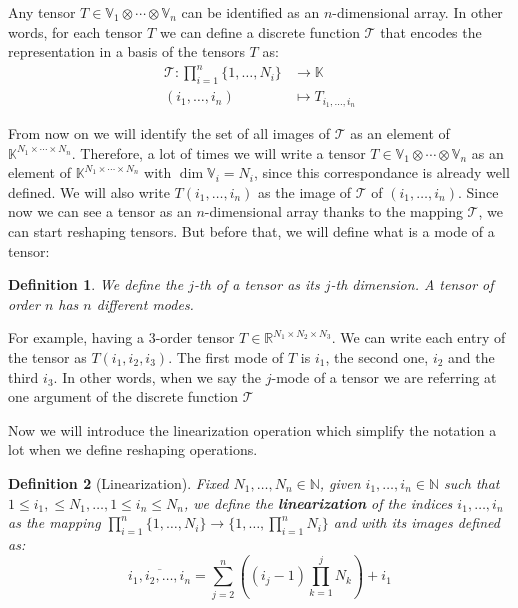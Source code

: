 \documentclass[11pt,a4paper,openright,oneside]{book}
\numberwithin{equation}{section}
\newtheorem{defn0}{Definition}[chapter]
\newenvironment{definition}{ \begin{defn0}}{\end{defn0}}
\begin{document}


Any tensor $T \in \mathbb{V}_1 \otimes \cdots \otimes \mathbb{V}_n$ can be identified as an $n$-dimensional array. In other words, for each
tensor $T$ we can define a discrete function $\mathcal{T}$ that encodes the representation in a basis of the tensors $T$ as:
$$\begin{align}
    \mathcal{T}: \prod_{i=1}^n \{1, \dots, N_i\} & \longrightarrow \mathbb{K} \\
    (i_1, \dots, i_n) & \longmapsto T_{i_1, \dots, i_n}
\end{align}$$

From now on we will identify the set of all images of $\mathcal{T}$ as
an element of ${\mathbb{K}^{N_1 \times \cdots \times N_n}}$.
Therefore, a lot of times we will write a tensor $T \in \mathbb{V}_1 \otimes \cdots \otimes \mathbb{V}_n$ as an element of $\mathbb{K}^{N_1 \times \cdots \times N_n}$
with $\dim \mathbb{V}_i = N_i$, since this correspondance is already well defined. We will also write $T(i_1, \dots, i_n)$ as the image of $\mathcal{T}$ of $(i_1, \dots, i_n)$.
Since now we can see a tensor as an $n$-dimensional array thanks to the mapping $\mathcal{T}$, we can 
start reshaping tensors. But before that, we will define what is a mode of a tensor:

\begin{definition}
We define the $j$-th of a tensor as its $j$-th dimension. A tensor of order $n$ has $n$ different modes.
\end{definition}

For example, having a $3$-order tensor $T \in \mathbb{R}^{N_1 \times N_2 \times N_3}$. We can write each entry of the tensor
as $T(i_1, i_2, i_3)$. The first mode of $T$ is $i_1$, the second one, $i_2$ and the third $i_3$. In other words, when we say
the $j$-mode of a tensor we are referring at one argument of the discrete function $\mathcal{T}$


Now we will introduce the linearization operation which simplify the notation a lot when we define
reshaping operations.

\begin{definition}[Linearization]
    Fixed $N_1, \dots, N_n \in \mathbb{N}$, given $i_1, \dots, i_n \in \mathbb{N}$ such that $1 \leqslant i_1, \leqslant N_1, \dots, 1 \leqslant i_n \leqslant N_n$,
    we define the \textbf{linearization} of the indices $i_1, \dots, i_n$ as the mapping ${\prod_{i=1}^n \{1, \dots, N_i\} \rightarrow \{1, \dots, \prod_{i=1}^n N_i\}}$ and
    with its images defined as:
    $$\overline {i_1, i_2, \dots, i_n} = \sum_{j=2}^{n} \left( (i_j - 1) \prod_{k=1}^j N_k \right) + i_1$$
\end{definition}
\end{document}
